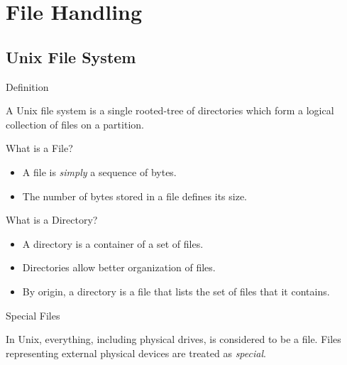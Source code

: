 \documentclass[compress]{beamer}
\begin{document}
\prepareCover

\section{File Handling}

\subsection{Unix File System}

\begin{slide}
	\begin{block}{Definition}

	A Unix file system is a single rooted-tree of directories which form a logical collection of files on a partition.

	\end{block}
\end{slide}

\begin{slide}
	\begin{block}{What is a File?}

	\begin{itemize}
	\item[] A file is \emph{simply} a sequence of bytes.
	\item[] The number of bytes stored in a file defines its size.
	\end{itemize}

	\end{block}
\end{slide}

\begin{slide}
	\begin{block}{What is a Directory?}

	\begin{itemize}
	\item[] A directory is a container of a set of files.
	\item[] Directories allow better organization of files.
	\item[] By origin, a directory is a file that lists the set of files that it contains.
	\end{itemize}

	\end{block}
\end{slide}

\begin{slide}
	\begin{block}{Special Files}

	In Unix, everything, including physical drives, is considered to be a file.
	Files representing external physical devices are treated as \emph{special}.

	\end{block}
\end{slide}
\end{document}
